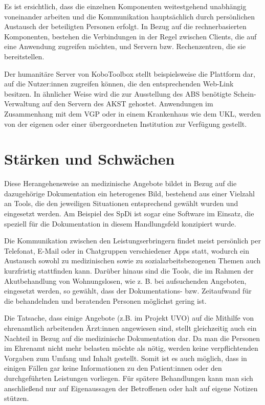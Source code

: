 Es ist ersichtlich, dass die einzelnen Komponenten weitestgehend unabhängig voneinander arbeiten und die Kommunikation hauptsächlich durch persönlichen Austausch der beteiligten Personen erfolgt. In Bezug auf die  rechnerbasierten Komponenten, bestehen die Verbindungen in der Regel zwischen Clients, die auf eine Anwendung zugreifen möchten, und Servern bzw. Rechenzentren, die sie bereitstellen.

Der humanitäre Server von KoboToolbox stellt beispielsweise die Plattform dar, auf die Nutzer:innen zugreifen können, die den entsprechenden Web-Link besitzen. In ähnlicher Weise wird die zur Ausstellung des \ac{ABS} benötigte Schein-Verwaltung auf den Servern des \ac{AKST} gehostet. Anwendungen im Zusammenhang mit dem \ac{VGP} oder in einem Krankenhaus wie dem \ac{UKL}, werden von der eigenen oder einer übergeordneten Institution zur Verfügung gestellt.


\section{Stärken und Schwächen}\label{sec:analysis}

Diese Herangehensweise an medizinische Angebote bildet in Bezug auf die dazugehörige Dokumentation ein heterogenes Bild, bestehend aus einer Vielzahl an Tools, die den jeweiligen Situationen entsprechend gewählt wurden und eingesetzt werden. Am Beispiel des \ac{SpDi} ist sogar eine Software im Einsatz, die speziell für die Dokumentation in diesem Handlungsfeld konzipiert wurde.

Die Kommunikation zwischen den Leistungserbringern findet meist persönlich per Telefonat, E-Mail oder in Chatgruppen verschiedener Apps statt, wodurch ein Austausch sowohl zu medizinischen sowie zu sozialarbeitsbezogenen Themen auch kurzfristig stattfinden kann. Darüber hinaus sind die Tools, die im Rahmen der Akutbehandlung von Wohnungslosen, wie z. B. bei aufsuchenden Angeboten, eingesetzt werden, so gewählt, dass der Dokumentations- bzw. Zeitaufwand für die behandelnden und beratenden Personen möglichst gering ist.

Die Tatsache, dass einige Angebote (z.B. im Projekt \ac{UVO}) auf die Mithilfe von ehrenamtlich arbeitenden Ärzt:innen angewiesen sind, stellt gleichzeitig auch ein Nachteil in Bezug auf die medizinische Dokumentation dar. Da man die Personen im Ehrenamt nicht mehr belasten möchte als nötig, werden keine verpflichtenden Vorgaben zum Umfang und Inhalt gestellt. Somit ist es auch möglich, dass in einigen Fällen gar keine Informationen zu den Patient:innen oder den durchgeführten Leistungen vorliegen. Für spätere Behandlungen kann man sich anschließend nur auf Eigenaussagen der Betroffenen oder halt auf eigene Notizen stützen.

